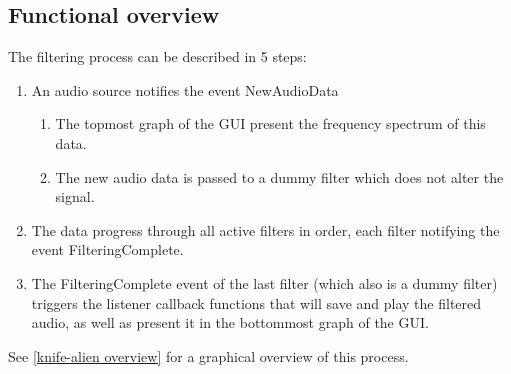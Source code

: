 \documentclass[journal]{IEEEtran}
\begin{document}
\subsection{Functional overview}
The filtering process can be described in 5 steps:
\begin{enumerate}
\item An audio source notifies the event NewAudioData
\begin{enumerate}
\item The topmost graph of the GUI present the frequency spectrum of this data.
\item The new audio data is passed to a dummy filter which does not alter the signal.
\end{enumerate}
\item The data progress through all active filters in order, each filter notifying the event FilteringComplete.
\item The FilteringComplete event of the last filter (which also is a dummy filter) triggers the listener callback functions that will save and play the filtered audio, as well as present it in the bottommost graph of the GUI.
\end{enumerate}
See \autoref*{knife-alien overview} for a graphical overview of this process.
\end{document}
